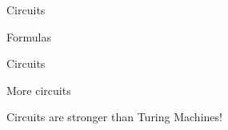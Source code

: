 \begin{frame}{Circuits}

        \begin{minipage}{0.33\linewidth}
        \centering
        Formulas
        \vspace{0.2cm}
        
        
    \end{minipage}
    \begin{minipage}{0.33\linewidth}
        \centering
        Circuits
        \vspace{0.2cm}
        
        
    \end{minipage}
    \begin{minipage}{0.32\linewidth}
        \centering
        More circuits
        \vspace{0.2cm}
        
        
    \end{minipage}

    \pause

    \vspace{1cm}
    \begin{center}
        Circuits are stronger than Turing Machines!
    \end{center}

\end{frame}

